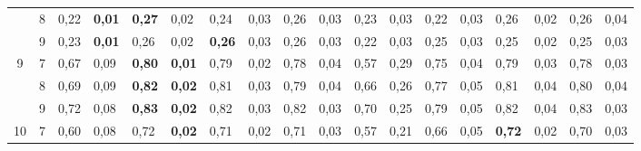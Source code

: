 \documentclass[conference]{IEEEtran}
\begin{document}
\begin{table}[]
\begin{tabular}{|cl|ll|ll|ll|ll|ll|ll|ll|ll|}
		\multicolumn{1}{|c|}{}                    & 8 & \multicolumn{1}{l|}{0,22} & \textbf{0,01} & \multicolumn{1}{l|}{\textbf{0,27}} & 0,02          & \multicolumn{1}{l|}{0,24}          & 0,03 & \multicolumn{1}{l|}{0,26}          & 0,03 & \multicolumn{1}{l|}{0,23}                 & 0,03 & \multicolumn{1}{l|}{0,22} & 0,03 & \multicolumn{1}{l|}{0,26}          & 0,02          & \multicolumn{1}{l|}{0,26}          & 0,04          \\ \cline{2-18} 
		\multicolumn{1}{|c|}{}                    & 9 & \multicolumn{1}{l|}{0,23} & \textbf{0,01} & \multicolumn{1}{l|}{0,26}          & 0,02          & \multicolumn{1}{l|}{\textbf{0,26}} & 0,03 & \multicolumn{1}{l|}{0,26}          & 0,03 & \multicolumn{1}{l|}{0,22}                 & 0,03 & \multicolumn{1}{l|}{0,25} & 0,03 & \multicolumn{1}{l|}{0,25}          & 0,02          & \multicolumn{1}{l|}{0,25}          & 0,03          \\ \hline
		\multicolumn{1}{|c|}{\multirow{3}{*}{9}}  & 7 & \multicolumn{1}{l|}{0,67} & 0,09          & \multicolumn{1}{l|}{\textbf{0,80}} & \textbf{0,01} & \multicolumn{1}{l|}{0,79}          & 0,02 & \multicolumn{1}{l|}{0,78}          & 0,04 & \multicolumn{1}{l|}{0,57}                 & 0,29 & \multicolumn{1}{l|}{0,75} & 0,04 & \multicolumn{1}{l|}{0,79}          & 0,03          & \multicolumn{1}{l|}{0,78}          & 0,03          \\ \cline{2-18} 
		\multicolumn{1}{|c|}{}                    & 8 & \multicolumn{1}{l|}{0,69} & 0,09          & \multicolumn{1}{l|}{\textbf{0,82}} & \textbf{0,02} & \multicolumn{1}{l|}{0,81}          & 0,03 & \multicolumn{1}{l|}{0,79}          & 0,04 & \multicolumn{1}{l|}{0,66}                 & 0,26 & \multicolumn{1}{l|}{0,77} & 0,05 & \multicolumn{1}{l|}{0,81}          & 0,04          & \multicolumn{1}{l|}{0,80}          & 0,04          \\ \cline{2-18} 
		\multicolumn{1}{|c|}{}                    & 9 & \multicolumn{1}{l|}{0,72} & 0,08          & \multicolumn{1}{l|}{\textbf{0,83}} & \textbf{0,02} & \multicolumn{1}{l|}{0,82}          & 0,03 & \multicolumn{1}{l|}{0,82}          & 0,03 & \multicolumn{1}{l|}{0,70}                 & 0,25 & \multicolumn{1}{l|}{0,79} & 0,05 & \multicolumn{1}{l|}{0,82}          & 0,04          & \multicolumn{1}{l|}{0,83}          & 0,03          \\ \hline
		\multicolumn{1}{|c|}{\multirow{3}{*}{10}} & 7 & \multicolumn{1}{l|}{0,60} & 0,08          & \multicolumn{1}{l|}{0,72}          & \textbf{0,02} & \multicolumn{1}{l|}{0,71}          & 0,02 & \multicolumn{1}{l|}{0,71}          & 0,03 & \multicolumn{1}{l|}{0,57}                 & 0,21 & \multicolumn{1}{l|}{0,66} & 0,05 & \multicolumn{1}{l|}{\textbf{0,72}} & 0,02          & \multicolumn{1}{l|}{0,70}          & 0,03          \\ \cline{2-18} 

\end{tabular}
\end{table}
\end{document}
